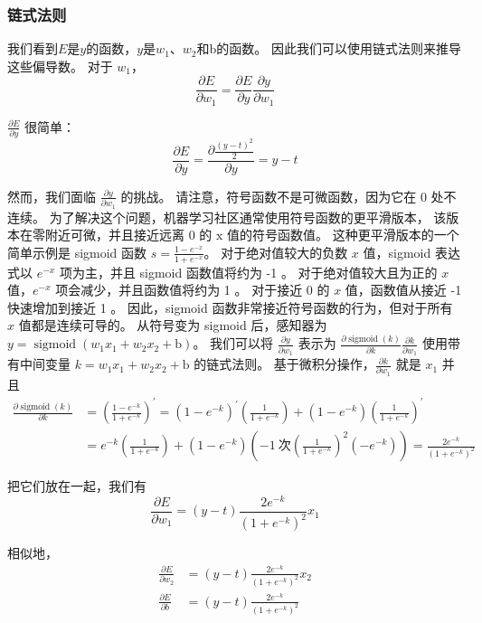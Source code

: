 \subsubsection{链式法则}
我们看到$E$是$y$的函数，$y$是$w_{1}、w_{2}$和$\mathrm{b}$的函数。 因此我们可以使用链式法则来推导这些偏导数。 
对于 $w_{1}$，
$$
\frac{\partial E}{\partial w_{1}}=\frac{\partial E}{\partial y} \frac{\partial y}{\partial w_{1}}
$$

$\frac{\partial E}{\partial y}$ 很简单：
$$
\frac{\partial E}{\partial y}=\frac{\partial \frac{(y-t)^{2}}{2}}{\partial y}=y-t
$$

然而，我们面临 $\frac{\partial y}{\partial w_{1}}$ 的挑战。 请注意，符号函数不是可微函数，因为它在 0 处不连续。 
为了解决这个问题，机器学习社区通常使用符号函数的更平滑版本，
该版本在零附近可微，并且接近远离 0 的 $\mathrm{x}$ 值的符号函数值。 
这种更平滑版本的一个简单示例是 sigmoid 函数 $s=\frac{1-e^{-x}}{1+e^{-x}}$。 
对于绝对值较大的负数 $x$ 值，sigmoid 表达式以 $e^{-x}$ 项为主，并且 sigmoid 函数值将约为 -1 。 
对于绝对值较大且为正的 $x$ 值，$e^{-x}$ 项会减少，并且函数值将约为 1 。 
对于接近 0 的 $x$ 值，函数值从接近 -1 快速增加到接近 1 。 
因此，sigmoid 函数非常接近符号函数的行为，但对于所有 $x$ 值都是连续可导的。 
从符号变为 sigmoid 后，感知器为 $y=\operatorname{sigmoid}\left(w_{1} x_{1}+w_{2} x_{2}+\mathrm{b}\right)$。 
我们可以将 $\frac{\partial y}{\partial w_{1}}$ 
表示为 $\frac{\partial \operatorname{sigmoid}(k)}{\partial k} \frac{\partial k}{\partial w_{1}}$ 
使用带有中间变量 $k=w_{1} x_{1}+w_{2} x_{2}+\mathrm{b}$ 的链式法则。 
基于微积分操作，$\frac{\partial k}{\partial w_{1}}$ 就是 $x_{1}$ 并且
$$
\begin{aligned}
\frac{\partial \operatorname{sigmoid}(k)}{\partial k} & =\left(\frac{1-e^{-k}}{1+e^{-k}}\right)^ {\prime}=\left(1-e^{-k}\right)^{\prime}\left(\frac{1}{1+e^{-k}}\right)+\left(1 -e^{-k}\right)\left(\frac{1}{1+e^{-k}}\right)^{\prime} \\
& =e^{-k}\left(\frac{1}{1+e^{-k}}\right)+\left(1-e^{-k}\right)\left(-1 \ 次\left(\frac{1}{1+e^{-k}}\right)^{2}\left(-e^{-k}\right)\right)=\frac{2 e^{ -k}}{\left(1+e^{-k}\right)^{2}}
\end{aligned}
$$

把它们放在一起，我们有
$$
\frac{\partial E}{\partial w_{1}}=(y-t) \frac{2 e^{-k}}{\left(1+e^{-k}\right)^{2}} x_{1}
$$

相似地，
$$
\begin{aligned}
\frac{\partial E}{\partial w_{2}} & =(y-t) \frac{2 e^{-k}}{\left(1+e^{-k}\right)^{2} } x_{2} \\
\frac{\partial E}{\partial b} & =(y-t) \frac{2 e^{-k}}{\left(1+e^{-k}\right)^{2}}
\end{aligned}
$$


